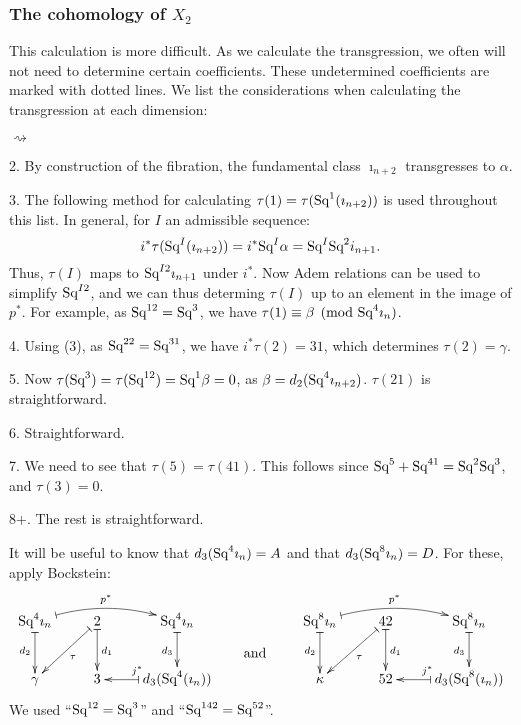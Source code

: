 \documentclass[11pt]{article}
\newcommand{\Squ}{\textup{Sq}}
\theoremstyle{plain}
\theoremstyle{definition}
\newenvironment{itemise}{
\begin{list}{\textup{$\rightsquigarrow$}}
   {
      \setlength{\topsep}{.1cm}
      \setlength{\itemsep}{1pt}
      \setlength{\parskip}{0pt}
      \setlength{\parsep}{0pt}
   }
}{\end{list}\vspace{-.2cm}}
\begin{document}
\subsubsection{\texorpdfstring{The cohomology of $X_2$}{The cohomology of X2}}
This calculation is more difficult. As we calculate the transgression, we often
will not need to determine certain coefficients. These undetermined coefficients
are marked with dotted lines. We list the considerations when calculating the
transgression at each dimension:
\begin{itemise}
\item[2.]By construction of the fibration, the fundamental class
$\imath_{n+2}$ transgresses to $\alpha$.
\item[3.] The following method for calculating $\tau(1)=\tau(\Squ^1(\imath_{n+2}))$
 is used throughout this list. In general, for $I$ an admissible sequence:
\[i^*\tau(\Squ^I(\imath_{n+2}))=i^*\Squ^I\alpha=\Squ^I\Squ^2i_{n+1}.\]
Thus, $\tau(I)$ maps to $\Squ^{I2}\imath_{n+1}$ under $i^*$. Now Adem relations
can be used to simplify $\Squ^{I2}$, and we can thus determing $\tau(I)$ up to
an element in the image of $p^*$. For example, as $\Squ^{12}=\Squ^3$, we have
$\tau(1)\equiv\beta\pmod{\Squ^4\imath_n}$.
\item[4.] Using (3), as $\Squ^{22}=\Squ^{31}$, we have $i^*\tau(2)=31$,
which determines $\tau(2)=\gamma$.
\item[5.] Now $\tau(\Squ^3)=\tau(\Squ^{12})=\Squ^1\beta=0$, as 
$\beta=d_2(\Squ^4\imath_{n+2})$. $\tau(21)$ is straightforward.
\item[6.] Straightforward.
\item[7.] We need to see that $\tau(5)=\tau(41)$. This follows since
$\Squ^5+\Squ^{41}=\Squ^2\Squ^3$, and $\tau(3)=0$.
\item[8+.] The rest is straightforward.
\end{itemise}
It will be useful to know that $d_3(\Squ^4\imath_n)=A$ and that
$d_3(\Squ^8\imath_n)=D$. For these, apply Bockstein:
\[\xymatrix{
\Squ^4\imath_n\ar@{|->}[d]_{d_2}\ar@{|->}@/^.81pc/[rr]^{p^*}&
2\ar@{|->}[ld]^\tau\ar@{|->}[d]^{d_1}&
\Squ^4\imath_n\ar@{|->}[d]_{d_{3}}\\
\gamma&
3&d_3(\Squ^4(\imath_n))\ar@{|->}[l]_{j^*}
}
\raisebox{-.8cm}{\qquad and\qquad\ }
\xymatrix{
\Squ^8\imath_n\ar@{|->}[d]_{d_2}\ar@{|->}@/^.81pc/[rr]^{p^*}&
42\ar@{|->}[ld]^\tau\ar@{|->}[d]^{d_1}&
\Squ^8\imath_n\ar@{|->}[d]_{d_{3}}\\
\kappa&
52&d_3(\Squ^8(\imath_n))\ar@{|->}[l]_{j^*}
}
\]
We used ``$\Squ^{12}=\Squ^{3}$'' and
``$\Squ^{142}=\Squ^{52}$''.
\end{document}
